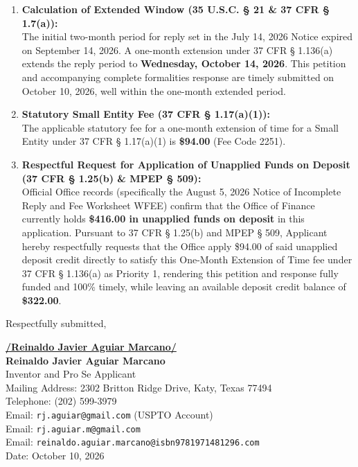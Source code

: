 \documentclass[11pt,letterpaper]{article}
\begin{document}
\begin{enumerate}[leftmargin=*]
    \item \textbf{Calculation of Extended Window (35 U.S.C. \S{} 21 \& 37 CFR \S{} 1.7(a)):} \\
    The initial two-month period for reply set in the July 14, 2026 Notice expired on September 14, 2026. A one-month extension under 37 CFR \S{} 1.136(a) extends the reply period to \textbf{Wednesday, October 14, 2026}. This petition and accompanying complete formalities response are timely submitted on October 10, 2026, well within the one-month extended period.

    \item \textbf{Statutory Small Entity Fee (37 CFR \S{} 1.17(a)(1)):} \\
    The applicable statutory fee for a one-month extension of time for a Small Entity under 37 CFR \S{} 1.17(a)(1) is \textbf{\$94.00} (Fee Code 2251).

    \item \textbf{Respectful Request for Application of Unapplied Funds on Deposit (37 CFR \S{} 1.25(b) \& MPEP \S{} 509):} \\
    Official Office records (specifically the August 5, 2026 Notice of Incomplete Reply and Fee Worksheet WFEE) confirm that the Office of Finance currently holds \textbf{\$416.00 in unapplied funds on deposit} in this application. Pursuant to 37 CFR \S{} 1.25(b) and MPEP \S{} 509, Applicant hereby respectfully requests that the Office apply \$94.00 of said unapplied deposit credit directly to satisfy this One-Month Extension of Time fee under 37 CFR \S{} 1.136(a) as Priority 1, rendering this petition and response fully funded and 100\% timely, while leaving an available deposit credit balance of \textbf{\$322.00}.
\end{enumerate}

\vspace{0.6cm}
\begin{singlespace}
\noindent Respectfully submitted, \par\vspace{0.8cm}
\underline{\textbf{/Reinaldo Javier Aguiar Marcano/}} \\
\textbf{Reinaldo Javier Aguiar Marcano} \\
Inventor and Pro Se Applicant \\
Mailing Address: 2302 Britton Ridge Drive, Katy, Texas 77494 \\
Telephone: (202) 599-3979 \\
Email: \texttt{rj.aguiar@gmail.com} (USPTO Account) \\
Email: \texttt{rj.aguiar.m@gmail.com} \\
Email: \texttt{reinaldo.aguiar.marcano@isbn9781971481296.com} \\
Date: October 10, 2026
\end{singlespace}
\end{document}
